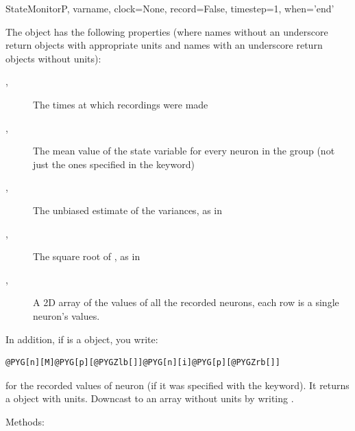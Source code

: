 \documentclass[letterpaper,10pt,english]{manual}
\begin{document}
\begin{classdesc}{StateMonitor}{P, varname, clock=None, record=False, timestep=1, when='end'}
\begin{description}
\end{description}

The \hyperlink{brian.StateMonitor}{} object has the following properties (where names
without an underscore return  objects with appropriate
units and names with an underscore return  objects without
units):
\begin{description}
\item[, ] \leavevmode
The times at which recordings were made

\item[, ] \leavevmode
The mean value of the state variable for every neuron in the
group (not just the ones specified in the  keyword)

\item[, ] \leavevmode
The unbiased estimate of the variances, as in 

\item[, ] \leavevmode
The square root of , as in 

\item[, ] \leavevmode
A 2D array of the values of all the recorded neurons, each row is a
single neuron's values.

\end{description}

In addition, if  is a \hyperlink{brian.StateMonitor}{} object, you write:

\begin{Verbatim}[commandchars=@\[\]]
@PYG[n][M]@PYG[p][@PYGZlb[]]@PYG[n][i]@PYG[p][@PYGZrb[]]
\end{Verbatim}

for the recorded values of neuron  (if it was specified with the
 keyword). It returns a  object with units. Downcast
to an array without units by writing .

Methods:


\end{classdesc}
\end{document}
